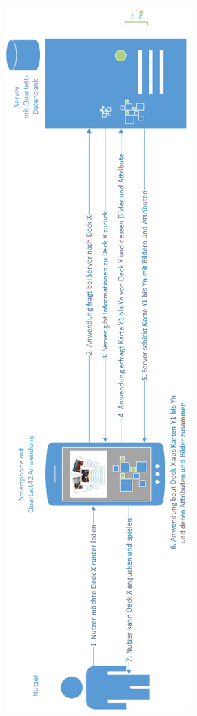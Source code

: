 \begin{figure}[htp]
\centering
\begin{minipage}{.45\textwidth}
  \centering
  \includegraphics[width=.95\linewidth]{img/modelle/downloadmodell.png}

\end{minipage}
\end{figure}
